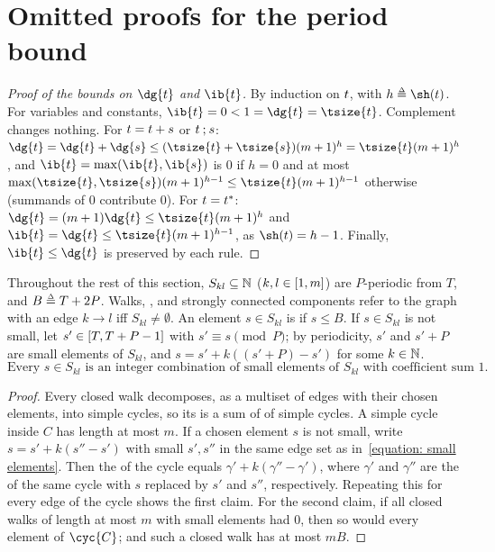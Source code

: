\section{Omitted proofs for the period bound}\label{section: appendix: upper bound}

\begin{proof}[Proof of the bounds on $\dg{\term}$ and $\ib{\term}$]
    By induction on $\term$, with $h \defeq \sh(\term)$.
    For variables and constants, $\ib{\term} = 0 < 1 = \dg{\term} = \tsize{\term}$.
    Complement changes nothing.
    For $\term = \term[1] \union \term[2]$ or $\term[1] \compo \term[2]$:
    $\dg{\term} = \dg{\term[1]} + \dg{\term[2]} \le (\tsize{\term[1]} + \tsize{\term[2]}) (m+1)^{h} = \tsize{\term} (m+1)^{h}$,
    and $\ib{\term} = \max(\ib{\term[1]}, \ib{\term[2]})$ is $0$ if $h = 0$ and at most $\max(\tsize{\term[1]}, \tsize{\term[2]}) (m+1)^{h-1} \le \tsize{\term} (m+1)^{h-1}$ otherwise (summands of  $0$ contribute $0$).
    For $\term = \term[1]^{*}$: $\dg{\term} = (m+1) \dg{\term[1]} \le \tsize{\term[1]} (m+1)^{h}$ and $\ib{\term} = \dg{\term[1]} \le \tsize{\term[1]} (m+1)^{h - 1}$, as $\sh(\term[1]) = h - 1$.
    Finally, $\ib{\term} \le \dg{\term}$ is preserved by each rule.
\end{proof}

Throughout the rest of this section, $S_{kl} \subseteq \mathbb{N}$ ($k, l \in [1, m]$) are $P$-periodic from $T$, and $B \defeq T + 2P$.
Walks, , and strongly connected components refer to the graph with an edge $k \to l$ iff $S_{kl} \neq \emptyset$.
An element $s \in S_{kl}$ is  if $s \le B$.
If $s \in S_{kl}$ is not small, let $s' \in [T, T + P - 1]$ with $s' \equiv s \pmod P$; by periodicity, $s'$ and $s' + P$ are small elements of $S_{kl}$, and $s = s' + k ((s' + P) - s')$ for some $k \in \mathbb{N}$.
\begin{equation}
    \text{Every } s \in S_{kl} \text{ is an integer combination of small elements of } S_{kl} \text{ with coefficient sum } 1. \label{equation: small elements}
\end{equation}

\lemmaSmallCycle*
\begin{proof}
    Every closed walk decomposes, as a multiset of edges with their chosen elements, into simple cycles, so its  is a sum of  of simple cycles.
    A simple cycle inside $C$ has length at most $m$.
    If a chosen element $s$ is not small, write $s = s' + k (s'' - s')$ with small $s', s''$ in the same edge set as in~\eqref{equation: small elements}.
    Then the  of the cycle equals $\gamma' + k (\gamma'' - \gamma')$, where $\gamma'$ and $\gamma''$ are the  of the same cycle with $s$ replaced by $s'$ and $s''$, respectively.
    Repeating this for every edge of the cycle shows the first claim.
    For the second claim, if all closed walks of length at most $m$ with small elements had  $0$, then so would every element of $\cyc{C}$; and such a closed walk has  at most $m B$.
\end{proof}

